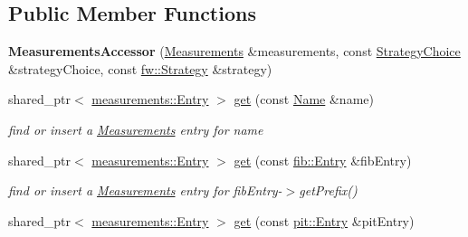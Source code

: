 \subsection*{Public Member Functions}
\begin{DoxyCompactItemize}
\item 
{\bfseries Measurements\+Accessor} (\hyperlink{classnfd_1_1Measurements}{Measurements} \&measurements, const \hyperlink{classnfd_1_1StrategyChoice}{Strategy\+Choice} \&strategy\+Choice, const \hyperlink{classnfd_1_1fw_1_1Strategy}{fw\+::\+Strategy} \&strategy)\hypertarget{classnfd_1_1MeasurementsAccessor_a469c35a2463235d4be8a14f97434e9fc}{}\label{classnfd_1_1MeasurementsAccessor_a469c35a2463235d4be8a14f97434e9fc}

\item 
shared\+\_\+ptr$<$ \hyperlink{classnfd_1_1measurements_1_1Entry}{measurements\+::\+Entry} $>$ \hyperlink{classnfd_1_1MeasurementsAccessor_a3ec097e3a2c629413854df23220016aa}{get} (const \hyperlink{classndn_1_1Name}{Name} \&name)\hypertarget{classnfd_1_1MeasurementsAccessor_a3ec097e3a2c629413854df23220016aa}{}\label{classnfd_1_1MeasurementsAccessor_a3ec097e3a2c629413854df23220016aa}

\begin{DoxyCompactList}\small\item\em find or insert a \hyperlink{classnfd_1_1Measurements}{Measurements} entry for {\ttfamily name} \end{DoxyCompactList}\item 
shared\+\_\+ptr$<$ \hyperlink{classnfd_1_1measurements_1_1Entry}{measurements\+::\+Entry} $>$ \hyperlink{classnfd_1_1MeasurementsAccessor_a41ba52f1a046501c5ddbead79ff09da5}{get} (const \hyperlink{classnfd_1_1fib_1_1Entry}{fib\+::\+Entry} \&fib\+Entry)\hypertarget{classnfd_1_1MeasurementsAccessor_a41ba52f1a046501c5ddbead79ff09da5}{}\label{classnfd_1_1MeasurementsAccessor_a41ba52f1a046501c5ddbead79ff09da5}

\begin{DoxyCompactList}\small\item\em find or insert a \hyperlink{classnfd_1_1Measurements}{Measurements} entry for {\ttfamily fib\+Entry-\/$>$get\+Prefix()} \end{DoxyCompactList}\item 
shared\+\_\+ptr$<$ \hyperlink{classnfd_1_1measurements_1_1Entry}{measurements\+::\+Entry} $>$ \hyperlink{classnfd_1_1MeasurementsAccessor_a0b3450befe5cdd25af94d15b33f92ff3}{get} (const \hyperlink{classnfd_1_1pit_1_1Entry}{pit\+::\+Entry} \&pit\+Entry)\hypertarget{classnfd_1_1MeasurementsAccessor_a0b3450befe5cdd25af94d15b33f92ff3}{}\label{classnfd_1_1MeasurementsAccessor_a0b3450befe5cdd25af94d15b33f92ff3}


\end{DoxyCompactItemize}
